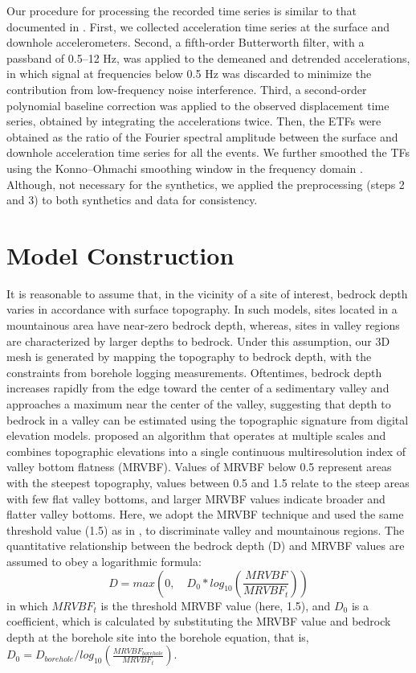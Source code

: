 {Our procedure for processing the recorded time series is similar to that documented in \citet{taoInsightsModelingSmallstrain2019}. First, we collected acceleration time series at the surface and downhole accelerometers. Second, a fifth-order Butterworth filter, with a passband of 0.5–12 Hz, was applied to the demeaned and detrended accelerations, in which signal at frequencies below 0.5 Hz was discarded to minimize the contribution from low-frequency noise interference. Third, a second-order polynomial baseline correction was applied to the observed displacement time series, obtained by integrating the accelerations twice. Then, the ETFs were obtained as the ratio of the Fourier spectral amplitude between the surface and downhole acceleration time series for all the events. We further smoothed the TFs using the Konno–Ohmachi smoothing window in the frequency domain \citep{konnoGroundmotionCharacteristicsEstimated1998}. Although, not necessary for the synthetics, we applied the preprocessing (steps 2 and 3) to both synthetics and data for consistency.


\section{Model Construction}\label{etf:model}
It is reasonable to assume that, in the vicinity of a site of interest, bedrock depth varies in accordance with surface topography. In such models, sites located in a mountainous area have near-zero bedrock depth, whereas, sites in valley regions are characterized by larger depths to bedrock. Under this assumption, our 3D mesh is generated by mapping the topography to bedrock depth, with the constraints from borehole logging measurements. Oftentimes, bedrock depth increases
rapidly from the edge toward the center of a sedimentary valley and approaches a maximum near the center of the valley, suggesting that depth to bedrock in a valley can be estimated using the topographic signature from digital elevation models. \citet{gallantMultiresolutionIndexValley2003} proposed an algorithm that operates at multiple scales and combines topographic elevations into a single continuous multiresolution index of valley bottom flatness (MRVBF). Values of MRVBF below 0.5 represent areas with the steepest topography, values between 0.5 and 1.5 relate to the steep areas with few flat valley bottoms, and larger MRVBF values indicate broader and flatter valley bottoms. Here, we adopt the MRVBF technique and used the same threshold value (1.5) as in \citet{gallantMultiresolutionIndexValley2003}, to discriminate valley and mountainous regions. The quantitative relationship between the bedrock depth (D) and MRVBF values are assumed to obey a logarithmic formula:
\begin{equation}\label{eq:etf-3}
  D = max(0,\quad D_0 * log_{10}(\frac{MRVBF}{MRVBF_t}))
\end{equation}
\noindent in which $MRVBF_t$ is the threshold MRVBF value (here, 1.5), and $D_0$ is a coefficient, which is calculated by substituting the MRVBF value and bedrock depth at the borehole site into the borehole equation, that is, $D_0=D_{borehole}/log_{10}(\frac{MRVBF_{borehole}}{MRVBF_t})$.

}
